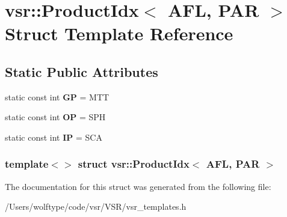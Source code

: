 \hypertarget{structvsr_1_1_product_idx_3_01_a_f_l_00_01_p_a_r_01_4}{\section{vsr\-:\-:Product\-Idx$<$ A\-F\-L, P\-A\-R $>$ Struct Template Reference}
\label{structvsr_1_1_product_idx_3_01_a_f_l_00_01_p_a_r_01_4}
}
\subsection*{Static Public Attributes}
\begin{DoxyCompactItemize}
\item 
\hypertarget{structvsr_1_1_product_idx_3_01_a_f_l_00_01_p_a_r_01_4_a5417f84b35c63d68f682db232eb578f6}{static const int {\bfseries G\-P} = M\-T\-T}\label{structvsr_1_1_product_idx_3_01_a_f_l_00_01_p_a_r_01_4_a5417f84b35c63d68f682db232eb578f6}

\item 
\hypertarget{structvsr_1_1_product_idx_3_01_a_f_l_00_01_p_a_r_01_4_aa1fbcaf5156072af8344ab385aa37b15}{static const int {\bfseries O\-P} = S\-P\-H}\label{structvsr_1_1_product_idx_3_01_a_f_l_00_01_p_a_r_01_4_aa1fbcaf5156072af8344ab385aa37b15}

\item 
\hypertarget{structvsr_1_1_product_idx_3_01_a_f_l_00_01_p_a_r_01_4_a98f16e2d96559b1d0276062d7b0eeb18}{static const int {\bfseries I\-P} = S\-C\-A}\label{structvsr_1_1_product_idx_3_01_a_f_l_00_01_p_a_r_01_4_a98f16e2d96559b1d0276062d7b0eeb18}

\end{DoxyCompactItemize}
\subsubsection*{template$<$$>$ struct vsr\-::\-Product\-Idx$<$ A\-F\-L, P\-A\-R $>$}



The documentation for this struct was generated from the following file\-:\begin{DoxyCompactItemize}
\item 
/\-Users/wolftype/code/vsr/\-V\-S\-R/vsr\-\_\-templates.\-h\end{DoxyCompactItemize}
